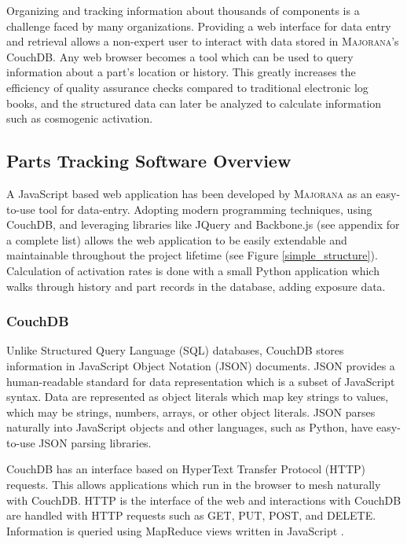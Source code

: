 \documentclass[journal]{IEEEtran}
\begin{document}
Organizing and tracking information about thousands of components is a
challenge faced by many organizations. Providing a web interface for data entry and retrieval allows
a non-expert user to interact with data stored in \textsc{Majorana}'s CouchDB. Any web browser becomes a tool which can
be used to query information about a part's location or history. This greatly increases the efficiency of quality assurance
checks compared to traditional electronic log books, and the structured data can later be analyzed to calculate information
such as cosmogenic activation.

\subsection{Parts Tracking Software Overview}
A JavaScript based web application has been developed by \textsc{Majorana} as an easy-to-use tool for data-entry.
Adopting modern programming techniques, using CouchDB, and leveraging libraries like JQuery and Backbone.js (see appendix for a complete list) allows the
web application to be easily extendable and maintainable throughout the project lifetime (see Figure \ref{simple_structure}). Calculation of
activation rates is done with a small Python application which walks through history and part records in the database,
adding exposure data.

\subsubsection{CouchDB}
Unlike Structured Query Language (SQL) databases, CouchDB stores information in JavaScript Object Notation (JSON) \cite{json}
documents.
JSON provides a human-readable
standard for data representation which is a subset of JavaScript syntax. Data are represented as object
literals which map key strings to values, which may be strings, numbers, arrays, or other object literals. 
JSON parses naturally into JavaScript objects and other languages, such as Python, have easy-to-use
JSON parsing libraries. 

CouchDB has an interface based on HyperText Transfer Protocol (HTTP) requests.
This allows applications which run in the browser to mesh naturally with CouchDB.
HTTP is the interface of the web and interactions with CouchDB are handled with HTTP
requests such as GET, PUT, POST, and DELETE. Information is queried using MapReduce
views written in JavaScript \cite{couchdb_guide}.
\end{document}

